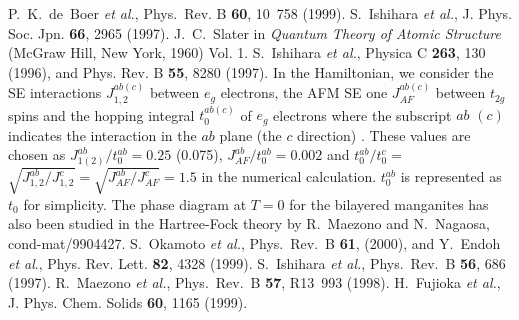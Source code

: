 \begin{references}
P.~K.~de~Boer {\it et al.},
Phys.~Rev. B {\bf 60}, 10~758 (1999).
S.~Ishihara {\it et al.},
J. Phys. Soc. Jpn. {\bf 66}, 2965 (1997).
J.~C.~Slater in {\em Quantum Theory of Atomic Structure}
(McGraw Hill, New York, 1960) Vol. 1.
S.~Ishihara {\it et al.},
Physica C {\bf 263}, 130 (1996), and Phys. Rev. B {\bf 55}, 8280 (1997).
In the Hamiltonian, we consider the SE interactions $J_{1,2}^{ab(c)}$ between $e_g$ electrons, the AFM SE one
$J_{AF}^{ab(c)}$ between $t_{2g}$ spins and
the hopping integral $t_0^{ab(c)}$ of $e_g$ electrons
where the subscript $ab$ $(c)$ indicates the interaction in
the $ab$ plane (the $c$ direction) \protect\cite{ishihara,ishihara2}.
These values are chosen as
$J_{1(2)}^{ab}/t_0^{ab}=0.25$ (0.075), $J_{AF}^{ab}/t_0^{ab}=0.002$ and
$t_0^{ab}/t_0^{c}=
$$
\sqrt{J_{1,2}^{ab}/J_{1,2}^{c}}=\sqrt{J_{AF}^{ab}/J_{AF}^{c}}=1.5$
in the numerical calculation. $t_0^{ab}$ is represented as $t_0$ for simplicity.
The phase diagram at $T=0$ for the bilayered manganites
has also been studied in the Hartree-Fock theory by
R.~Maezono and N.~Nagaosa, cond-mat/9904427.
S.~Okamoto {\it et al.},
Phys.~Rev.~B {\bf 61}, (2000),
and
Y.~Endoh {\it et al}.,
Phys. Rev. Lett. {\bf 82}, 4328 (1999).
S.~Ishihara {\it et al.},
Phys.~Rev.~B {\bf 56}, 686 (1997).
R.~Maezono {\it et al.},
Phys.~Rev.~B {\bf 57}, R13~993 (1998).
H.~Fujioka {\it et al.},
J. Phys. Chem. Solids {\bf 60}, 1165 (1999).
\end{references}
